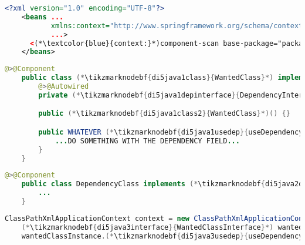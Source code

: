 \example
\begin{lstlisting}[language=XML, title={Configuration XML}]
    <?xml version="1.0" encoding="UTF-8"?>
    <beans ...
           xmlns:context="http://www.springframework.org/schema/context"
           ...>
      <(*\textcolor{blue}{context:}*)component-scan base-package="package.subfolder"/>
    </beans>
\end{lstlisting}
\begin{lstlisting}[language=Java, title={Wanted class with the zero--parameter constructor}]
    @>@Component
    public class (*\tikzmarknodebf{di5java1class}{WantedClass}*) implements (*\tikzmarknodebf{di5java1interface}{WantedClassInterface}*) {
        @>@Autowired
        private (*\tikzmarknodebf{di5java1depinterface}{DependencyInterface}*) dependencyField;

        public (*\tikzmarknodebf{di5java1class2}{WantedClass}*)() {}

        public WHATEVER (*\tikzmarknodebf{di5java1usedep}{useDependency}*)() {
            ...DO SOMETHING WITH THE DEPENDENCY FIELD...
        }
    }
\end{lstlisting}
\begin{lstlisting}[language=Java, title={Dependency class}]
    @>@Component
    public class DependencyClass implements (*\tikzmarknodebf{di5java2depinterface}{DependencyInterface}*) {
        ...
    }
\end{lstlisting}
\begin{lstlisting}[language=Java, title={Usage}]
    ClassPathXmlApplicationContext context = new ClassPathXmlApplicationContext("configurationFile.xml");
    (*\tikzmarknodebf{di5java3interface}{WantedClassInterface}*) wantedClassInstance = context.getBean("(*\tikzmarknodebf{di5java3beanid}{wantedClass}[ForestGreen]*)", (*\tikzmarknodebf{di5java3interface2}{WantedClassInterface}*).class);
    wantedClassInstance.(*\tikzmarknodebf{di5java3usedep}{useDependency}*)();
\end{lstlisting}
\newpage


